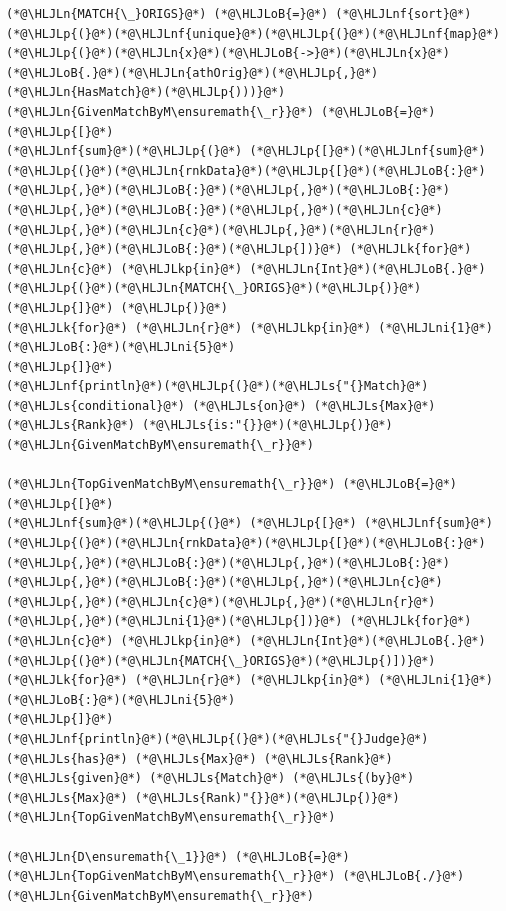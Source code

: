 \documentclass[12pt,a4paper]{article}
\newcommand{\HLJLk}[1]{\textcolor[RGB]{148,91,176}{\textbf{#1}}}
\newcommand{\HLJLkp}[1]{\textcolor[RGB]{148,91,176}{\textbf{#1}}}
\newcommand{\HLJLn}[1]{#1}
\newcommand{\HLJLnf}[1]{\textcolor[RGB]{66,102,213}{#1}}
\newcommand{\HLJLs}[1]{\textcolor[RGB]{201,61,57}{#1}}
\newcommand{\HLJLni}[1]{\textcolor[RGB]{59,151,46}{#1}}
\newcommand{\HLJLoB}[1]{\textcolor[RGB]{102,102,102}{\textbf{#1}}}
\newcommand{\HLJLp}[1]{#1}
\begin{document}
\begin{lstlisting}
(*@\HLJLn{MATCH{\_}ORIGS}@*) (*@\HLJLoB{=}@*) (*@\HLJLnf{sort}@*)(*@\HLJLp{(}@*)(*@\HLJLnf{unique}@*)(*@\HLJLp{(}@*)(*@\HLJLnf{map}@*)(*@\HLJLp{(}@*)(*@\HLJLn{x}@*)(*@\HLJLoB{->}@*)(*@\HLJLn{x}@*)(*@\HLJLoB{.}@*)(*@\HLJLn{athOrig}@*)(*@\HLJLp{,}@*)(*@\HLJLn{HasMatch}@*)(*@\HLJLp{)))}@*)
(*@\HLJLn{GivenMatchByM\ensuremath{\_r}}@*) (*@\HLJLoB{=}@*) (*@\HLJLp{[}@*)
(*@\HLJLnf{sum}@*)(*@\HLJLp{(}@*) (*@\HLJLp{[}@*)(*@\HLJLnf{sum}@*)(*@\HLJLp{(}@*)(*@\HLJLn{rnkData}@*)(*@\HLJLp{[}@*)(*@\HLJLoB{:}@*)(*@\HLJLp{,}@*)(*@\HLJLoB{:}@*)(*@\HLJLp{,}@*)(*@\HLJLoB{:}@*)(*@\HLJLp{,}@*)(*@\HLJLoB{:}@*)(*@\HLJLp{,}@*)(*@\HLJLn{c}@*)(*@\HLJLp{,}@*)(*@\HLJLn{c}@*)(*@\HLJLp{,}@*)(*@\HLJLn{r}@*)(*@\HLJLp{,}@*)(*@\HLJLoB{:}@*)(*@\HLJLp{])}@*) (*@\HLJLk{for}@*) (*@\HLJLn{c}@*) (*@\HLJLkp{in}@*) (*@\HLJLn{Int}@*)(*@\HLJLoB{.}@*)(*@\HLJLp{(}@*)(*@\HLJLn{MATCH{\_}ORIGS}@*)(*@\HLJLp{)}@*) (*@\HLJLp{]}@*) (*@\HLJLp{)}@*)
(*@\HLJLk{for}@*) (*@\HLJLn{r}@*) (*@\HLJLkp{in}@*) (*@\HLJLni{1}@*)(*@\HLJLoB{:}@*)(*@\HLJLni{5}@*)
(*@\HLJLp{]}@*)
(*@\HLJLnf{println}@*)(*@\HLJLp{(}@*)(*@\HLJLs{"{}Match}@*) (*@\HLJLs{conditional}@*) (*@\HLJLs{on}@*) (*@\HLJLs{Max}@*) (*@\HLJLs{Rank}@*) (*@\HLJLs{is:"{}}@*)(*@\HLJLp{)}@*)
(*@\HLJLn{GivenMatchByM\ensuremath{\_r}}@*)

(*@\HLJLn{TopGivenMatchByM\ensuremath{\_r}}@*) (*@\HLJLoB{=}@*) (*@\HLJLp{[}@*)
(*@\HLJLnf{sum}@*)(*@\HLJLp{(}@*) (*@\HLJLp{[}@*) (*@\HLJLnf{sum}@*)(*@\HLJLp{(}@*)(*@\HLJLn{rnkData}@*)(*@\HLJLp{[}@*)(*@\HLJLoB{:}@*)(*@\HLJLp{,}@*)(*@\HLJLoB{:}@*)(*@\HLJLp{,}@*)(*@\HLJLoB{:}@*)(*@\HLJLp{,}@*)(*@\HLJLoB{:}@*)(*@\HLJLp{,}@*)(*@\HLJLn{c}@*)(*@\HLJLp{,}@*)(*@\HLJLn{c}@*)(*@\HLJLp{,}@*)(*@\HLJLn{r}@*)(*@\HLJLp{,}@*)(*@\HLJLni{1}@*)(*@\HLJLp{])}@*) (*@\HLJLk{for}@*) (*@\HLJLn{c}@*) (*@\HLJLkp{in}@*) (*@\HLJLn{Int}@*)(*@\HLJLoB{.}@*)(*@\HLJLp{(}@*)(*@\HLJLn{MATCH{\_}ORIGS}@*)(*@\HLJLp{)])}@*)
(*@\HLJLk{for}@*) (*@\HLJLn{r}@*) (*@\HLJLkp{in}@*) (*@\HLJLni{1}@*)(*@\HLJLoB{:}@*)(*@\HLJLni{5}@*)
(*@\HLJLp{]}@*)
(*@\HLJLnf{println}@*)(*@\HLJLp{(}@*)(*@\HLJLs{"{}Judge}@*) (*@\HLJLs{has}@*) (*@\HLJLs{Max}@*) (*@\HLJLs{Rank}@*) (*@\HLJLs{given}@*) (*@\HLJLs{Match}@*) (*@\HLJLs{(by}@*) (*@\HLJLs{Max}@*) (*@\HLJLs{Rank)"{}}@*)(*@\HLJLp{)}@*)
(*@\HLJLn{TopGivenMatchByM\ensuremath{\_r}}@*)

(*@\HLJLn{D\ensuremath{\_1}}@*) (*@\HLJLoB{=}@*) (*@\HLJLn{TopGivenMatchByM\ensuremath{\_r}}@*) (*@\HLJLoB{./}@*) (*@\HLJLn{GivenMatchByM\ensuremath{\_r}}@*)
\end{lstlisting}
\end{document}
